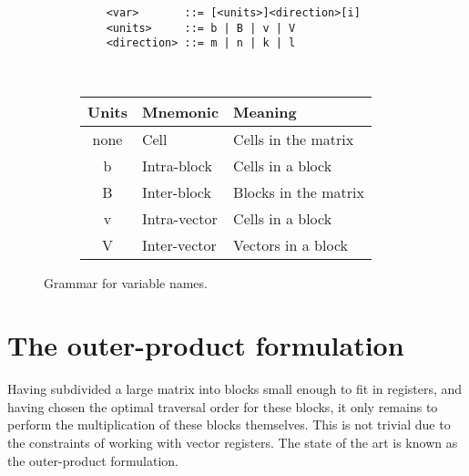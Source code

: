 \begin{figure}[tbh]
  \centering
  \begin{subfigure}[l]{0.48\textwidth}
      \begin{verbatim}
    <var>       ::= [<units>]<direction>[i]
    <units>     ::= b | B | v | V
    <direction> ::= m | n | k | l
  \end{verbatim}
  \end{subfigure}
  ~~~~
  \begin{subfigure}[r]{0.45\textwidth}
    \centering
    \begin{tabular}{cll}
		\toprule
		Units    & Mnemonic & Meaning \\
		\midrule

		none  & Cell          & Cells in the matrix      \\
		b     & Intra-block   & Cells in a block         \\
		B     & Inter-block   & Blocks in the matrix     \\
		v     & Intra-vector  & Cells in a block         \\
		V     & Inter-vector  & Vectors in a block       \\
		\bottomrule
	\end{tabular}
  \end{subfigure}
  \caption{Grammar for variable names.}
  \label{fig:grammar}
\end{figure}


\section{The outer-product formulation}

Having subdivided a large matrix into blocks small enough to fit in registers, and having chosen the optimal traversal order for these blocks, it only remains to perform the multiplication of these blocks themselves. This is not trivial due to the constraints of working with vector registers. The state of the art is known as the outer-product formulation.

